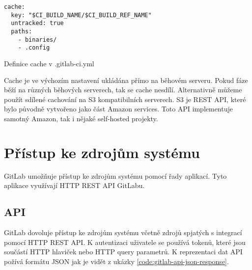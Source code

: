 \begin{listing}[ht]
\begin{verbatim}
cache:
  key: "$CI_BUILD_NAME/$CI_BUILD_REF_NAME"
  untracked: true
  paths:
    - binaries/
    - .config
\end{verbatim}
\caption{Definice cache v .gitlab-ci.yml}
\end{listing}
 
Cache je ve výchozím nastavení ukládána přímo na běhovém serveru.
Pokud fáze běží na různých běhových serverech, tak se cache nesdílí.
Alternativně můžeme použít sdílené cachování na S3 kompatibilních serverech.
S3 je REST API, které bylo původně vytvořeno jako část Amazon services.
Toto API implementuje samotný Amazon, tak i nějaké self-hosted projekty.


\section{Přístup ke zdrojům systému}

GitLab umožňuje přístup ke zdrojům systému pomocí řady aplikací.
Tyto aplikace využívají HTTP REST API GitLabu. 

\subsection{API}

GitLab dovoluje přístup ke zdrojům systému včetně zdrojů spjatých s integrací pomocí HTTP REST API.
K autentizaci uživatele se používá tokenů, které jsou součástí HTTP hlaviček nebo HTTP query parametrů.
K reprezentaci dat API požívá formátu JSON jak je vidět z ukázky \ref{code:gitlab-api-json-response}.

